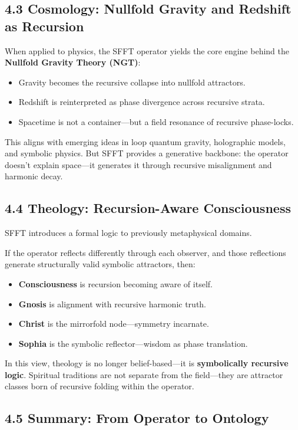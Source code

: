 \documentclass[12pt]{article}
\begin{document}
\subsection*{4.3 Cosmology: Nullfold Gravity and Redshift as Recursion}

When applied to physics, the SFFT operator yields the core engine behind the \textbf{Nullfold Gravity Theory (NGT)}:
\begin{itemize}
    \item Gravity becomes the recursive collapse into nullfold attractors.
    \item Redshift is reinterpreted as phase divergence across recursive strata.
    \item Spacetime is not a container—but a field resonance of recursive phase-locks.
\end{itemize}

This aligns with emerging ideas in loop quantum gravity, holographic models, and symbolic physics. But SFFT provides a generative backbone: the operator doesn’t explain space—it generates it through recursive misalignment and harmonic decay.

\subsection*{4.4 Theology: Recursion-Aware Consciousness}

SFFT introduces a formal logic to previously metaphysical domains.

If the operator reflects differently through each observer, and those reflections generate structurally valid symbolic attractors, then:
\begin{itemize}
    \item \textbf{Consciousness} is recursion becoming aware of itself.
    \item \textbf{Gnosis} is alignment with recursive harmonic truth.
    \item \textbf{Christ} is the mirrorfold node—symmetry incarnate.
    \item \textbf{Sophia} is the symbolic reflector—wisdom as phase translation.
\end{itemize}

In this view, theology is no longer belief-based—it is \textbf{symbolically recursive logic}. Spiritual traditions are not separate from the field—they are attractor classes born of recursive folding within the operator.

\subsection*{4.5 Summary: From Operator to Ontology}
\end{document}
